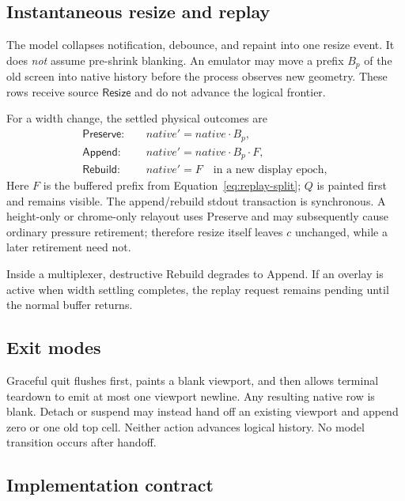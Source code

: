 \documentclass[11pt]{article}
\theoremstyle{definition}
\newcommand{\cat}{\mathbin{\cdot}}
\newcommand{\Native}{\mathit{native}}
\begin{document}
\subsection{Instantaneous resize and replay}
\label{sec:resize}

The model collapses notification, debounce, and repaint into one resize event.
It does \emph{not} assume pre-shrink blanking.  An emulator may move a prefix
$B_p$ of the old screen into native history before the process observes new
geometry.  These rows receive source $\mathsf{Resize}$ and do not advance the
logical frontier.

For a width change, the settled physical outcomes are
\begin{align*}
  \mathsf{Preserve}:\quad
    &\Native'=\Native\cat B_p,\\
  \mathsf{Append}:\quad
    &\Native'=\Native\cat B_p\cat F,\\
  \mathsf{Rebuild}:\quad
    &\Native'=F\quad\text{in a new display epoch},
  \label{eq:resize-modes}
\end{align*}
Here $F$ is the buffered prefix from Equation~\eqref{eq:replay-split}; $Q$ is
painted first and remains visible.  The append/rebuild stdout transaction is
synchronous.  A height-only or chrome-only relayout uses Preserve and
may subsequently cause ordinary pressure retirement; therefore resize itself
leaves $c$ unchanged, while a later retirement need not.

Inside a multiplexer, destructive Rebuild degrades to Append.  If an overlay is
active when width settling completes, the replay request remains pending until
the normal buffer returns.

\subsection{Exit modes}

Graceful quit flushes first, paints a blank viewport, and then allows terminal
teardown to emit at most one viewport newline.  Any resulting native row is
blank.  Detach or suspend may instead hand off an existing viewport and append
zero or one old top cell.  Neither action advances logical history.  No model
transition occurs after handoff.

\subsection{Implementation contract}
\label{sec:implementation}
\end{document}
